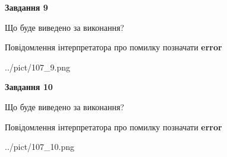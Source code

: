 \documentclass[12pt, ukrainian]{article}
\begin{document}
{{\begin {center}\textbf{Завдання 9}\end {center}}\par
Що буде виведено за виконання? \par
Повідомлення інтерпретатора про помилку позначати \textbf{error}

\begin{center}
	{../pict/107_9.png}
\end{center}
\newpage

{\begin {center}\textbf{Завдання 10}\end {center}}\par
Що буде виведено за виконання? \par
Повідомлення інтерпретатора про помилку позначати \textbf{error}

\begin{center}
	{../pict/107_10.png}
\end{center}
\newpage

}
\end{document}
